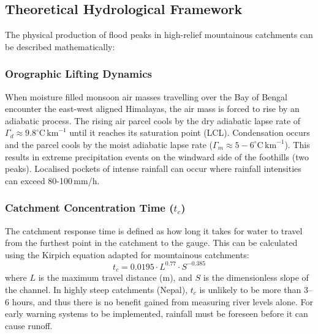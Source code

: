 \documentclass[journal]{IEEEtran}
\begin{document}
\subsection{Theoretical Hydrological Framework}
The physical production of flood peaks in high-relief mountainous catchments can be described mathematically:

\subsubsection{Orographic Lifting Dynamics}
When moisture filled monsoon air masses travelling over the Bay of Bengal encounter the east-west aligned Himalayas, the air mass is forced to rise by an adiabatic process. The rising air parcel cools by the dry adiabatic lapse rate of $\Gamma_d \approx 9.8^\circ\text{C}\,\text{km}^{-1}$ until it reaches its saturation point (LCL). Condensation occurs and the parcel cools by the moist adiabatic lapse rate ($\Gamma_m \approx 5-6^\circ\text{C}\,\text{km}^{-1}$). This results in extreme precipitation events on the windward side of the foothills (two peaks). Localised pockets of intense rainfall can occur where rainfall intensities can exceed 80-100\,mm/h.

\subsubsection{Catchment Concentration Time (\texorpdfstring{$t_c$}{tc})}
The catchment response time is defined as how long it takes for water to travel from the furthest point in the catchment to the gauge. This can be calculated using the Kirpich equation adapted for mountainous catchments:
\begin{equation}
t_c = 0.0195 \cdot L^{0.77} \cdot S^{-0.385}
\label{eq:kirpich}
\end{equation}
where $L$ is the maximum travel distance (m), and $S$ is the dimensionless slope of the channel. In highly steep catchments (Nepal), $t_c$ is unlikely to be more than 3--6 hours, and thus there is no benefit gained from measuring river levels alone. For early warning systems to be implemented, rainfall must be foreseen before it can cause runoff.
\end{document}
